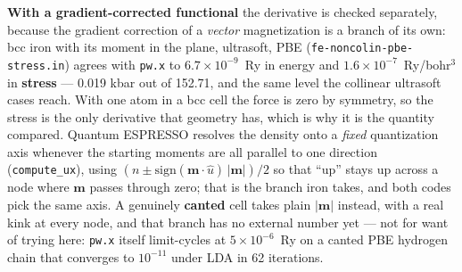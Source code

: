 \documentclass[11pt,a4paper]{article}
\newcommand{\qe}{Quantum ESPRESSO}
\newcommand{\code}[1]{\texttt{\small #1}}
\begin{document}
\textbf{With a gradient-corrected functional} the derivative is checked
separately, because the gradient correction of a \emph{vector} magnetization is a
branch of its own: bcc iron with its moment in the plane, ultrasoft, PBE
(\code{fe-noncolin-pbe-stress.in}) agrees with \code{pw.x} to
$6.7\times10^{-9}$~Ry in energy and $1.6\times10^{-7}$~Ry/bohr$^3$ in
\textbf{stress} --- 0.019 kbar out of 152.71, and the same level the collinear
ultrasoft cases reach. With one atom in a bcc cell the force is zero by symmetry,
so the stress is the only derivative that geometry has, which is why it is the
quantity compared. \qe{} resolves the density onto a \emph{fixed} quantization
axis whenever the starting moments are all parallel to one direction
(\code{compute\_ux}), using $(n \pm \mathrm{sign}(\mathbf m\cdot\hat u)\,|\mathbf
m|)/2$ so that ``up'' stays up across a node where $\mathbf m$ passes through
zero; that is the branch iron takes, and both codes pick the same axis. A
genuinely \textbf{canted} cell takes plain $|\mathbf m|$ instead, with a real kink
at every node, and that branch has no external number yet --- not for want of
trying here: \code{pw.x} itself limit-cycles at $5\times10^{-6}$~Ry on a canted
PBE hydrogen chain that converges to $10^{-11}$ under LDA in 62 iterations.
\end{document}
